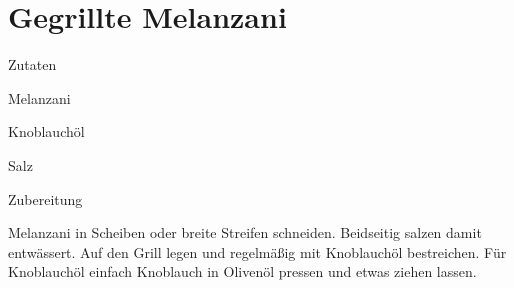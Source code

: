 \chapter*{Gegrillte Melanzani}
\begin{multicols}{2}
 {\Large Zutaten}
 \begin{Zutaten}
		\item Melanzani
		\item Knoblauchöl
		\item Salz
		
				
\end{Zutaten}
	
\columnbreak
\end{multicols}

{\Large Zubereitung} \newline
\begin{addmargin}[1cm]{0cm}
	Melanzani in Scheiben oder breite Streifen schneiden.\newline
	Beidseitig salzen damit entwässert.\newline
	Auf den Grill legen und regelmäßig mit Knoblauchöl bestreichen.\newline
	\newline
	Für Knoblauchöl einfach Knoblauch in Olivenöl pressen und etwas ziehen lassen.
	
	
	
\end{addmargin}
